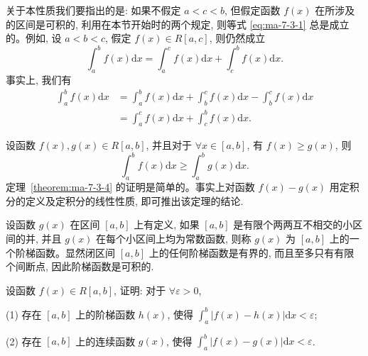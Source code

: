 关于本性质我们要指出的是: 如果不假定 $a<c<b$, 但假定函数 $f(x)$ 在所涉及的区间是可积的, 利用在本节开始时的两个规定, 则等式 \eqref{eq:ma-7-3-1} 总是成立的。例如, 设 $a<b<c$, 假定 $f(x)\in R[a,c]$, 则仍然成立
\[
  \int_a^b f(x)\mathrm dx=\int_a^c f(x)\mathrm dx+\int_c^b f(x)\mathrm dx.
\]
事实上, 我们有
\[
\begin{aligned}
  \int_a^b f(x)\mathrm dx
  &=\int_a^b f(x)\mathrm dx+\int_b^c f(x)\mathrm dx-\int_b^c f(x)\mathrm dx\\
  &=\int_a^c f(x)\mathrm dx+\int_c^b f(x)\mathrm dx.
\end{aligned}
\]

\begin{theorem}\label{theorem:ma-7-3-4}
设函数 $f(x),g(x)\in R[a,b]$, 并且对于 $\forall x\in[a,b]$, 有 $f(x)\geq g(x)$, 则
\[
  \int_a^b f(x)\mathrm dx\geq \int_a^b g(x)\mathrm dx.
\]
定理~\ref{theorem:ma-7-3-4} 的证明是简单的。事实上对函数 $f(x)-g(x)$ 用定积分的定义及定积分的线性性质, 即可推出该定理的结论.
\end{theorem}

设函数 $g(x)$ 在区间 $[a,b]$ 上有定义, 如果 $[a,b]$ 是有限个两两互不相交的小区间的并, 并且 $g(x)$ 在每个小区间上均为常数函数, 则称 $g(x)$ 为 $[a,b]$ 上的一个阶梯函数。显然闭区间 $[a,b]$ 上的任何阶梯函数是有界的, 而且至多只有有限个间断点, 因此阶梯函数是可积的.

\begin{example}\label{example:ma-7-3-1}
设函数 $f(x)\in R[a,b]$, 证明: 对于 $\forall\varepsilon>0$,

(1) 存在 $[a,b]$ 上的阶梯函数 $h(x)$, 使得 $\int_a^b |f(x)-h(x)|\mathrm dx<\varepsilon$;

(2) 存在 $[a,b]$ 上的连续函数 $g(x)$, 使得 $\int_a^b |f(x)-g(x)|\mathrm dx<\varepsilon$.
\end{example}


